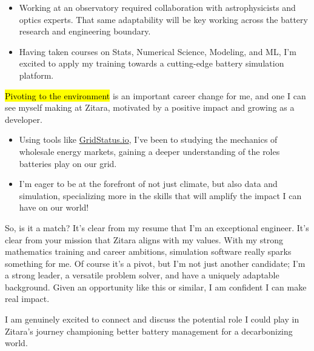 \documentclass{tc_cv}
\begin{document}
\begin{adjustwidth}{38pt}{38pt}
\begin{itemize}
    \item Working at an observatory required collaboration with astrophysicists
      and optics experts. That same adaptability will be key working across
      the battery research and engineering boundary.

    \item Having taken courses on Stats, Numerical Science, Modeling, and ML,
      I'm excited to apply my training towards a cutting-edge battery
      simulation platform.

  \end{itemize} \medbreak

  \hl{Pivoting to the environment} is an important career change for me, and
  one I can see myself making at Zitara, motivated by a positive impact
  and growing as a developer.
  \begin{itemize}

    \item Using tools like \href{http://gridwatch.io}{GridStatus.io}, I've been
      to studying the mechanics of wholesale energy markets, gaining a deeper
      understanding of the roles batteries play on our grid.

    \item I'm eager to be at the forefront of not just climate, but also data
      and simulation, specializing more in the skills that will amplify the
      impact I can have on our world!

  \end{itemize} \medbreak

  So, is it a match? It's clear from my resume that I'm an exceptional
  engineer. It's clear from your mission that Zitara aligns with my
  values. With my strong mathematics training and career ambitions, simulation
  software really sparks something for me. Of course it's a pivot, but I'm not
  just another candidate; I'm a strong leader, a versatile problem solver, and
  have a uniquely adaptable background. Given an opportunity like this or
  similar, I am confident I can make real impact. \medbreak

  I am genuinely excited to connect and discuss the potential role I could play
  in Zitara's journey championing better battery management for a decarbonizing
  world.


\end{adjustwidth}
\end{document}
